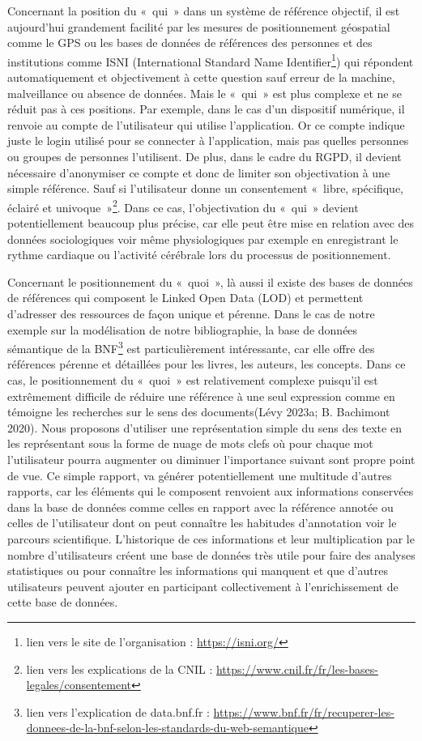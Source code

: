 \documentclass[
  letterpaper,
  DIV=11,
  numbers=noendperiod]{scrreprt}
\begin{document}
Concernant la position du «~qui~» dans un système de référence objectif,
il est aujourd'hui grandement facilité par les mesures de positionnement
géospatial comme le GPS ou les bases de données de références des
personnes et des institutions comme ISNI (International Standard Name
Identifier\footnote{lien vers le site de l'organisation :
  \url{https://isni.org/}}) qui répondent automatiquement et
objectivement à cette question sauf erreur de la machine, malveillance
ou absence de données. Mais le «~qui~» est plus complexe et ne se réduit
pas à ces positions. Par exemple, dans le cas d'un dispositif numérique,
il renvoie au compte de l'utilisateur qui utilise l'application. Or ce
compte indique juste le login utilisé pour se connecter à l'application,
mais pas quelles personnes ou groupes de personnes l'utilisent. De plus,
dans le cadre du RGPD, il devient nécessaire d'anonymiser ce compte et
donc de limiter son objectivation à une simple référence. Sauf si
l'utilisateur donne un consentement «~libre, spécifique, éclairé et
univoque~»\footnote{lien vers les explications de la CNIL :
  \url{https://www.cnil.fr/fr/les-bases-legales/consentement}}. Dans ce
cas, l'objectivation du «~qui~» devient potentiellement beaucoup plus
précise, car elle peut être mise en relation avec des données
sociologiques voir même physiologiques par exemple en enregistrant le
rythme cardiaque ou l'activité cérébrale lors du processus de
positionnement.

Concernant le positionnement du «~quoi~», là aussi il existe des bases
de données de références qui composent le Linked Open Data (LOD) et
permettent d'adresser des ressources de façon unique et pérenne. Dans le
cas de notre exemple sur la modélisation de notre bibliographie, la base
de données sémantique de la BNF\footnote{lien vers l'explication de
  data.bnf.fr :
  \url{https://www.bnf.fr/fr/recuperer-les-donnees-de-la-bnf-selon-les-standards-du-web-semantique}}
est particulièrement intéressante, car elle offre des références pérenne
et détaillées pour les livres, les auteurs, les concepts. Dans ce cas,
le positionnement du «~quoi~» est relativement complexe puisqu'il est
extrêmement difficile de réduire une référence à une seul expression
comme en témoigne les recherches sur le sens des documents(Lévy 2023a;
B. Bachimont 2020). Nous proposons d'utiliser une représentation simple
du sens des texte en les représentant sous la forme de nuage de mots
clefs où pour chaque mot l'utilisateur pourra augmenter ou diminuer
l'importance suivant sont propre point de vue. Ce simple rapport, va
générer potentiellement une multitude d'autres rapports, car les
éléments qui le composent renvoient aux informations conservées dans la
base de données comme celles en rapport avec la référence annotée ou
celles de l'utilisateur dont on peut connaître les habitudes
d'annotation voir le parcours scientifique. L'historique de ces
informations et leur multiplication par le nombre d'utilisateurs créent
une base de données très utile pour faire des analyses statistiques ou
pour connaître les informations qui manquent et que d'autres
utilisateurs peuvent ajouter en participant collectivement à
l'enrichissement de cette base de données.
\end{document}
